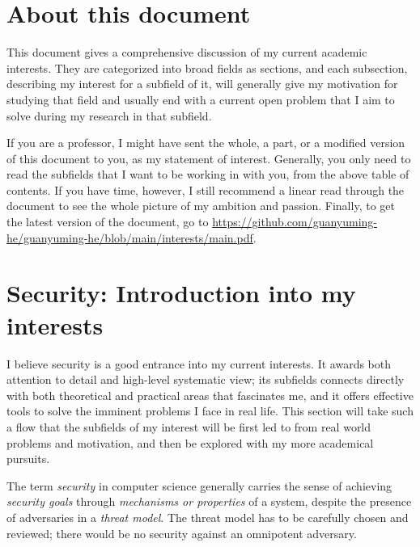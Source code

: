 \documentclass[10pt]{article}
\begin{document}
\tableofcontents

\section*{About this document}
This document gives a comprehensive discussion of my current academic
interests. They are categorized into broad fields as sections, and each
subsection, describing my interest for a subfield of it, will generally give my
motivation for studying that field and usually end with a current open problem
that I aim to solve during my research in that subfield.

If you are a professor, I might have sent the whole, a part, or a modified
version of this document to you, as my statement of interest. Generally, you
only need to read the subfields that I want to be working in with you, from the
above table of contents. If you have time, however, I still recommend a linear
read through the document to see the whole picture of my ambition and passion.
Finally, to get the latest version of the document, go to
\url{https://github.com/guanyuming-he/guanyuming-he/blob/main/interests/main.pdf}.

\section[Security]{Security: Introduction into my interests}
I believe security is a good entrance into my current interests. It awards both
attention to detail and high-level systematic view; its subfields connects
directly with both theoretical and practical areas that fascinates me, and it
offers effective tools to solve the imminent problems I face in real life. This
section will take such a flow that the subfields of my interest will be first
led to from real world problems and motivation, and then be explored with my
more academical pursuits.

The term \emph{security} in computer science generally carries the sense of
achieving \emph{security goals} through \emph{mechanisms or properties} of a
system, despite the presence of adversaries in a \emph{threat model}. The
threat model has to be carefully chosen and reviewed; there would be no
security against an omnipotent adversary.
\end{document}
